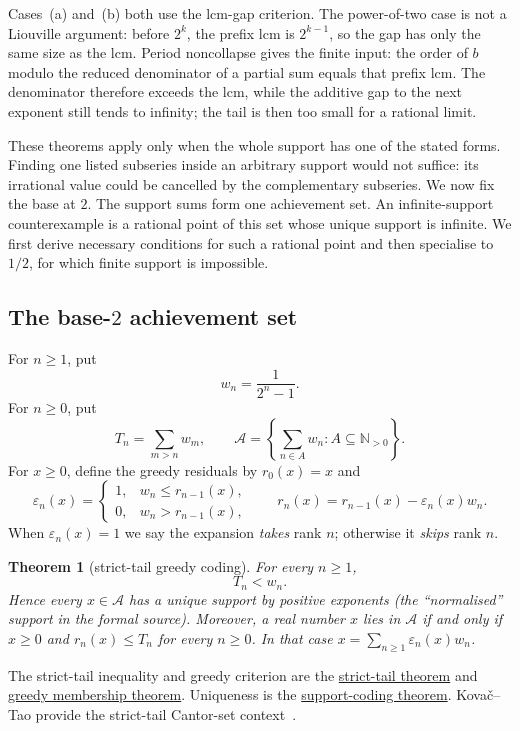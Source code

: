 \documentclass[11pt]{article}
\newcommand{\commit}{ebc98ee71f6819bd9fe344a0bb343542c604e533}
\newcommand{\repobase}{https://github.com/wcook04/plectis-lean-erdos249-257/blob/\commit}
\newcommand{\PK}{Erdos249257}
\newcommand{\lword}[4]{\href{\repobase/\PK/#1\#L#2}{#4}}
\newtheorem{theorem}{Theorem}[section]
\theoremstyle{definition}
\theoremstyle{remark}
\newcommand{\Npos}{\mathbb{N}_{>0}}
\begin{document}
Cases~\textup{(a)} and~\textup{(b)} both use the lcm-gap criterion.  The
power-of-two case is not a Liouville argument: before \(2^k\), the prefix lcm is
\(2^{k-1}\), so the gap has only the same size as the lcm.  Period noncollapse
gives the finite input: the order of \(b\) modulo the reduced denominator of a
partial sum equals that prefix lcm.  The denominator therefore exceeds the lcm,
while the additive gap to the next exponent still tends to infinity; the tail
is then too small for a rational limit.

These theorems apply only when the whole support has one of the stated forms.
Finding one listed subseries inside an arbitrary support would not suffice:
its irrational value could be cancelled by the complementary subseries.  We
now fix the base at \(2\).  The support sums form one achievement set.  An
infinite-support counterexample is a rational point of this set whose unique
support is infinite.  We first derive necessary conditions for such a rational point and
then specialise to \(1/2\), for which finite support is impossible.

\subsection{The base-$2$ achievement set}

For \(n\geq1\), put
\[
 w_n=\frac1{2^n-1}.
\]
For \(n\geq0\), put
\[
 T_n=\sum_{m>n}w_m,
 \qquad
 \mathcal A=\left\{\sum_{n\in A}w_n:A\subseteq\Npos\right\}.
\]
For \(x\geq0\), define the greedy residuals by \(r_0(x)=x\) and
\[
 \varepsilon_n(x)=
 \begin{cases}
  1,&w_n\leq r_{n-1}(x),\\
  0,&w_n>r_{n-1}(x),
 \end{cases}
 \qquad
 r_n(x)=r_{n-1}(x)-\varepsilon_n(x)w_n.
\]
When \(\varepsilon_n(x)=1\) we say the expansion \emph{takes} rank \(n\);
otherwise it \emph{skips} rank \(n\).

\begin{theorem}[strict-tail greedy coding]\label{res:greedy}
For every \(n\geq1\),
\[
 T_n<w_n.
\]
Hence every \(x\in\mathcal A\)
has a unique support by positive exponents (the ``normalised'' support in the
formal source).
Moreover, a real number \(x\) lies in \(\mathcal A\) if and only if \(x\geq0\)
and \(r_n(x)\leq T_n\) for every \(n\geq0\).  In that case
\(x=\sum_{n\geq1}\varepsilon_n(x)w_n\).
\end{theorem}
\noindent The strict-tail inequality and greedy criterion are the
\lword{GreedyAchievementSet.lean}{180}{mersenneTail_lt_weight}{strict-tail theorem}
and
\lword{GreedyAchievementSet.lean}{1445}{mem_mersenneAchievementSet_iff_greedy_survival}{greedy membership theorem}.
Uniqueness is the
\lword{GreedyAchievementSet.lean}{1527}{positiveMersenneSupportValue_injective_normalized}{support-coding theorem}.
Kova\v{c}--Tao provide the strict-tail Cantor-set context~\cite[Remark~4.1]{kovactao}.
\end{document}
